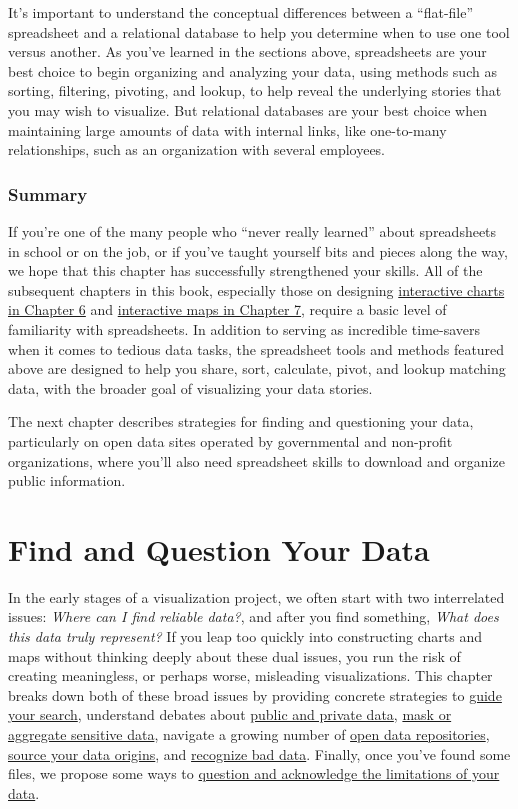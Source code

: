 \documentclass[
  english,
]{book}
\begin{document}
It's important to understand the conceptual differences between a ``flat-file'' spreadsheet and a relational database to help you determine when to use one tool versus another. As you've learned in the sections above, spreadsheets are your best choice to begin organizing and analyzing your data, using methods such as sorting, filtering, pivoting, and lookup, to help reveal the underlying stories that you may wish to visualize. But relational databases are your best choice when maintaining large amounts of data with internal links, like one-to-many relationships, such as an organization with several employees.

\hypertarget{summary2}{%
\subsection*{Summary}\label{summary2}}

If you're one of the many people who ``never really learned'' about spreadsheets in school or on the job, or if you've taught yourself bits and pieces along the way, we hope that this chapter has successfully strengthened your skills. All of the subsequent chapters in this book, especially those on designing \href{chart.html}{interactive charts in Chapter 6} and \href{map.html}{interactive maps in Chapter 7}, require a basic level of familiarity with spreadsheets. In addition to serving as incredible time-savers when it comes to tedious data tasks, the spreadsheet tools and methods featured above are designed to help you share, sort, calculate, pivot, and lookup matching data, with the broader goal of visualizing your data stories.

The next chapter describes strategies for finding and questioning your data, particularly on open data sites operated by governmental and non-profit organizations, where you'll also need spreadsheet skills to download and organize public information.

\hypertarget{find}{%
\chapter{Find and Question Your Data}\label{find}}

In the early stages of a visualization project, we often start with two interrelated issues: \emph{Where can I find reliable data?}, and after you find something, \emph{What does this data truly represent?} If you leap too quickly into constructing charts and maps without thinking deeply about these dual issues, you run the risk of creating meaningless, or perhaps worse, misleading visualizations. This chapter breaks down both of these broad issues by providing concrete strategies to \href{guiding.html}{guide your search}, understand debates about \href{public.html}{public and private data}, \href{mask-aggregate.html}{mask or aggregate sensitive data}, navigate a growing number of \href{opendata.html}{open data repositories}, \href{source.html}{source your data origins}, and \href{bad-data.html}{recognize bad data}. Finally, once you've found some files, we propose some ways to \href{question.html}{question and acknowledge the limitations of your data}.
\end{document}
